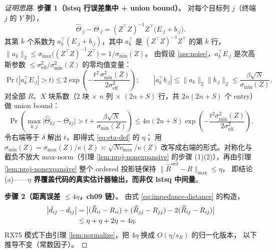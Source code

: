\documentclass[UTF8,11pt]{ctexart}
\begin{document}
\begin{proof}[证明思路]
\textbf{步骤 1（lstsq 行误差集中 + union bound）}。
对每个目标列 $j$（终端 $j$ 的 $Y$ 列），
\begin{equation}
  \widehat\Theta_{\cdot j}-\Theta_{\cdot j}
  =(Z^\top Z)^{-1}Z^\top\bigl(E_{\cdot j}+b_{\cdot j}\bigr).
\end{equation}
其第 $k$ 个系数为 $a_k^\top(E_{\cdot j}+b_{\cdot j})$，其中 $a_k^\top$ 是
$(Z^\top Z)^{-1}Z^\top$ 的第 $k$ 行，
$\|a_k\|_2\le\sigma_{\max}\bigl((Z^\top Z)^{-1}Z^\top\bigr)=1/\sigma_{\min}(Z)$。
由假设 \ref{ass:noise}，$a_k^\top E_{\cdot j}$ 是次高斯参数
$\le\sigma_{\mathrm{eff}}^2/\sigma_{\min}^2(Z)$ 的零均值变量：
\begin{equation}
  \Pr\bigl(|a_k^\top E_{\cdot j}|>t\bigr)
  \le 2\exp\!\left(-\frac{t^2\,\sigma_{\min}^2(Z)}{2\sigma_{\mathrm{eff}}^2}\right);
  \qquad
  |a_k^\top b_{\cdot j}|\le\|a_k\|_2\|b_{\cdot j}\|_2
  \le\frac{\beta\sqrt{N}}{\sigma_{\min}(Z)}.
  \label{eq:row-concentration}
\end{equation}
对全部 $R$、$X$ 块系数（$2$ 块 $\times$ $n$ 列 $\times$ $(2n+S)$ 行，共
$2n(2n+S)$ 个 entry）做 union bound：
\begin{equation}
  \Pr\!\left(\max_{k,j}\bigl|\widehat\Theta_{kj}-\Theta_{kj}\bigr|>t+\frac{\beta\sqrt N}{\sigma_{\min}(Z)}\right)
  \le
  4n(2n+S)\exp\!\left(-\frac{t^2\sigma_{\min}^2(Z)}{2\sigma_{\mathrm{eff}}^2}\right).
  \label{eq:union-bound}
\end{equation}
令右端等于 $\delta$ 解出 $t$，即得式 \eqref{eq:eta-def} 的 $\eta$；
用 $\sigma_{\min}(Z)=\sigma_{\max}(Z)/\kappa(Z)\asymp\sqrt{Nv_{\max}}/\kappa(Z)$
改写成右端的形式。对称化与截负不放大 max-norm（引理
\ref{lem:proj-nonexpansive} 的步骤 (1)(2)），再由引理 \ref{lem:proj-nonexpansive}
整个 ordered 投影链保持 $\|\widehat R^{\mathrm{ord}}-R\|_{\max}\le\eta$，
即结论 (a)——\textbf{$\eta$ 界覆盖代码的真实估计器输出，而非仅 lstsq 中间量}。

\textbf{步骤 2（距离误差 $\le 4\eta$，ch09 链）}。
由式 \eqref{eq:impedance-distance} 的构造，
\begin{align}
  \bigl|\hat d_{ij}-d_{ij}\bigr|
  &=
  \bigl|(\widehat R_{ii}-R_{ii})+(\widehat R_{jj}-R_{jj})
  -2(\widehat R_{ij}-R_{ij})\bigr|
  \notag\\
  &\le \eta+\eta+2\eta=4\eta.
  \label{eq:four-eta}
\end{align}
RX75 模式下由引理 \ref{lem:normalize}，把 $4\eta$ 换成 $O(\eta/s_R)$ 的归一化版本，
以下推导不变（常数因子）。


\end{proof}
\end{document}
